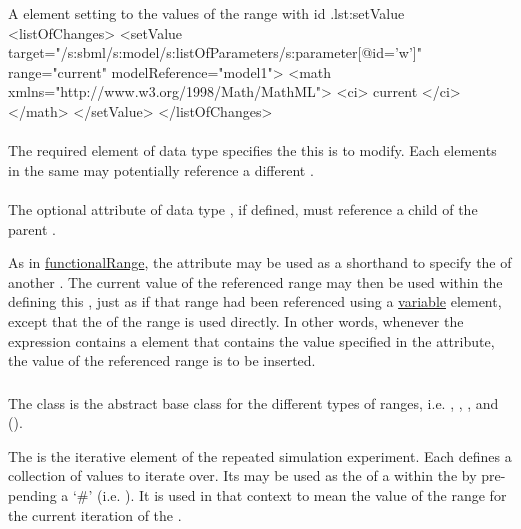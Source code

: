 \begin{myXmlLst}{A  element setting  to the values of the range with id .}{lst:setValue}
<listOfChanges>
	<setValue target="/s:sbml/s:model/s:listOfParameters/s:parameter[@id='w']"
		range="current" modelReference="model1">
		<math xmlns="http://www.w3.org/1998/Math/MathML">
			<ci> current </ci>
		</math>
	</setValue>
</listOfChanges>
\end{myXmlLst}

\paragraph*{}
\label{sec:subTaskModelReference}
The required element  of data type \SIdRef specifies the \Model this \SetValue is to modify.  Each \SetValue elements in the same \RepeatedTask may potentially reference a different \Model.

\paragraph*{}
\label{sec:subTaskRange}
The optional attribute  of data type \SIdRef, if defined, must reference a \Range child of the parent \RepeatedTask.

As in \hyperref[class:functionalRange]{functionalRange}, the attribute  may be used as a shorthand to specify the  of another . The current value of the referenced range may then be used within the \Math defining this , just as if that range had been referenced using a \hyperref[class:variable]{variable} element, except that the  of the range is used directly. In other words, whenever the expression contains a  element that contains the value specified in the  attribute, the value of the referenced range is to be inserted.



\subsubsection{}
\label{class:range}
The  class is the abstract base class for the different types of ranges, i.e. \UniformRange, \VectorRange, \FunctionalRange, and \DataRange (). 

The \Range is the iterative element of the repeated simulation experiment. Each \Range defines a collection of values to iterate over. Its  may be used as the  of a \Variable within the \RepeatedTask by pre-pending a `\#' (i.e. ).  It is used in that context to mean the value of the range for the current iteration of the \RepeatedTask.

